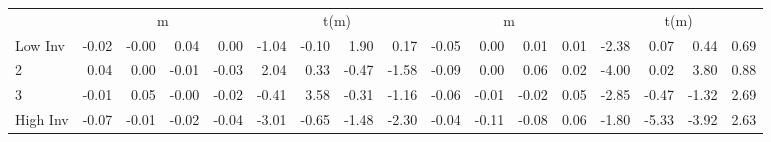 \begin{table}[!ht]
\begin{tabular}{lrrrrrrrrrrrrrrrr}
  
    
      & \multicolumn{4}{c}{m} & \multicolumn{4}{c}{t(m)}
    
      & \multicolumn{4}{c}{m} & \multicolumn{4}{c}{t(m)}
    
    \\
      \cmidrule(r){2-5} \cmidrule(r){6-9} \cmidrule(r){10-13} \cmidrule(r){14-17}

    Low Inv   & -0.02  & -0.00  & 0.04  & 0.00  & -1.04  & -0.10  & 1.90  & 0.17  & -0.05  & 0.00  & 0.01  & 0.01  & -2.38  & 0.07  & 0.44  & 0.69  \\
           2  & 0.04  & 0.00  & -0.01  & -0.03  & 2.04  & 0.33  & -0.47  & -1.58  & -0.09  & 0.00  & 0.06  & 0.02  & -4.00  & 0.02  & 3.80  & 0.88  \\
           3  & -0.01  & 0.05  & -0.00  & -0.02  & -0.41  & 3.58  & -0.31  & -1.16  & -0.06  & -0.01  & -0.02  & 0.05  & -2.85  & -0.47  & -1.32  & 2.69  \\
    High Inv  & -0.07  & -0.01  & -0.02  & -0.04  & -3.01  & -0.65  & -1.48  & -2.30  & -0.04  & -0.11  & -0.08  & 0.06  & -1.80  & -5.33  & -3.92  & 2.63  \\

  

  \bottomrule
\end{tabular}
\label{tbl:32_Size_OP_Inv_C97}
\end{table}